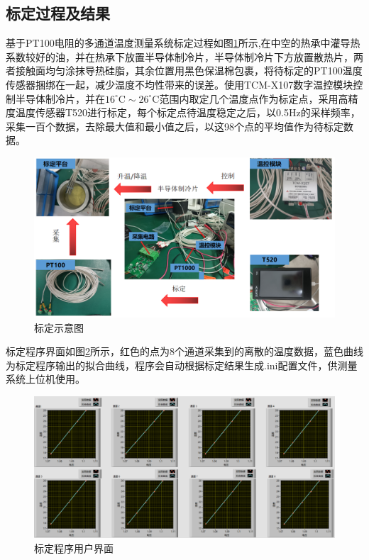 \subsection{标定过程及结果}
基于PT100电阻的多通道温度测量系统标定过程如图\ref{fig:标定示意图}所示,在中空的热承中灌导热系数较好的油，并在热承下放置半导体制冷片，半导体制冷片下方放置散热片，两者接触面均匀涂抹导热硅脂，其余位置用黑色保温棉包裹，将待标定的PT100温度传感器捆绑在一起，减少温度不均性带来的误差。使用TCM-X107数字温控模块控制半导体制冷片，并在\(16^{\circ} \mathrm{C} \sim 26^{\circ} \mathrm{C}\)范围内取定几个温度点作为标定点，采用高精度温度传感器T520进行标定，每个标定点待温度稳定之后，以0.5Hz的采样频率，采集一百个数据，去除最大值和最小值之后，以这98个点的平均值作为待标定数据。
  \begin{figure}[htb]
    \centering
    \includegraphics[width=12cm]{fig/3-fig/温度测量系统标定示意图.jpg}
    \caption{标定示意图}
    \label{fig:标定示意图}
\end{figure}

标定程序界面如图\ref{fig:标定程序用户界面}所示，红色的点为8个通道采集到的离散的温度数据，蓝色曲线为标定程序输出的拟合曲线，程序会自动根据标定结果生成.ini配置文件，供测量系统上位机使用。
\begin{figure}[htb]
    \centering
    \includegraphics[width=13cm]{fig/3-fig/标定程序前面板.jpg}
    \caption{标定程序用户界面}
    \label{fig:标定程序用户界面}
\end{figure}

